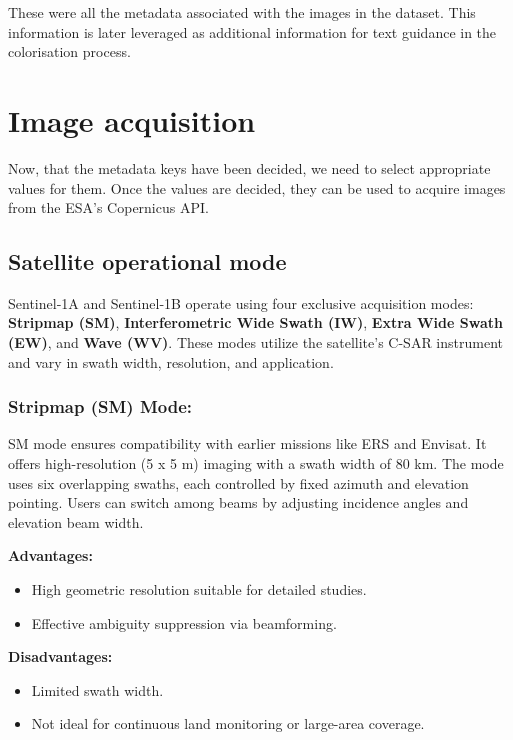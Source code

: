 These were all the metadata associated with the images in the dataset. This information is later leveraged as additional information for text guidance in the colorisation process.

\section{Image acquisition}

Now, that the metadata keys have been decided, we need to select appropriate values for them. Once the values are decided, they can be used to acquire images from the ESA's Copernicus API.

\subsection{Satellite operational mode}

Sentinel‑1A and Sentinel‑1B operate using four exclusive acquisition modes: \textbf{Stripmap (SM)}, \textbf{Interferometric Wide Swath (IW)}, \textbf{Extra Wide Swath (EW)}, and \textbf{Wave (WV)}. These modes utilize the satellite’s C-SAR instrument and vary in swath width, resolution, and application.\cite{eos2024sentinel1}

\subsubsection{Stripmap (SM) Mode:}

SM mode ensures compatibility with earlier missions like ERS and Envisat. It offers high-resolution (5 x 5 m) imaging with a swath width of 80 km. The mode uses six overlapping swaths, each controlled by fixed azimuth and elevation pointing. Users can switch among beams by adjusting incidence angles and elevation beam width.


\textbf{Advantages:}
\begin{itemize}
    \item High geometric resolution suitable for detailed studies.
    \item Effective ambiguity suppression via beamforming.
\end{itemize}

\textbf{Disadvantages:}
\begin{itemize}
    \item Limited swath width.
    \item Not ideal for continuous land monitoring or large-area coverage.
\end{itemize}

